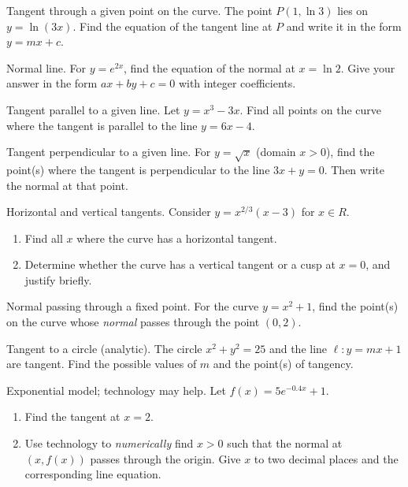 \documentclass[11pt]{article}
\def\textbf#1{#1}%
\def\mathbb#1{#1}%
\newcounter{question}
\begin{document}
\begin{question}
\textbf{Tangent through a given point on the curve.}
The point $P(1,\ln 3)$ lies on $y=\ln(3x)$. Find the equation of the tangent line at $P$ and write it in the form $y=mx+c$.
\end{question}

\begin{question}
\textbf{Normal line.}
For $y=e^{2x}$, find the equation of the normal at $x=\ln 2$. Give your answer in the form $ax+by+c=0$ with integer coefficients.
\end{question}

\begin{question}
\textbf{Tangent parallel to a given line.}
Let $y=x^3-3x$. Find all points on the curve where the tangent is parallel to the line $y=6x-4$.
\end{question}

\begin{question}
\textbf{Tangent perpendicular to a given line.}
For $y=\sqrt{x}$ (domain $x>0$), find the point(s) where the tangent is perpendicular to the line $3x+y=0$. Then write the normal at that point.
\end{question}

\begin{question}
\textbf{Horizontal and vertical tangents.}
Consider $y=x^{2/3}(x-3)$ for $x\in\mathbb R$.
\begin{enumerate}
  \item Find all $x$ where the curve has a horizontal tangent.
  \item Determine whether the curve has a vertical tangent or a cusp at $x=0$, and justify briefly.
\end{enumerate}
\end{question}

\begin{question}
\textbf{Normal passing through a fixed point.}
For the curve $y=x^2+1$, find the point(s) on the curve whose \emph{normal} passes through the point $(0,2)$.
\end{question}

\begin{question}
\textbf{Tangent to a circle (analytic).}
The circle $x^2+y^2=25$ and the line $\ell: y=mx+1$ are tangent. Find the possible values of $m$ and the point(s) of tangency.
\end{question}

\begin{question}
\textbf{Exponential model; technology may help.}
Let $f(x)=5e^{-0.4x}+1$. 
\begin{enumerate}
  \item Find the tangent at $x=2$.
  \item Use technology to \emph{numerically} find $x>0$ such that the normal at $(x,f(x))$ passes through the origin. Give $x$ to two decimal places and the corresponding line equation.
\end{enumerate}
\end{question}
\end{document}
